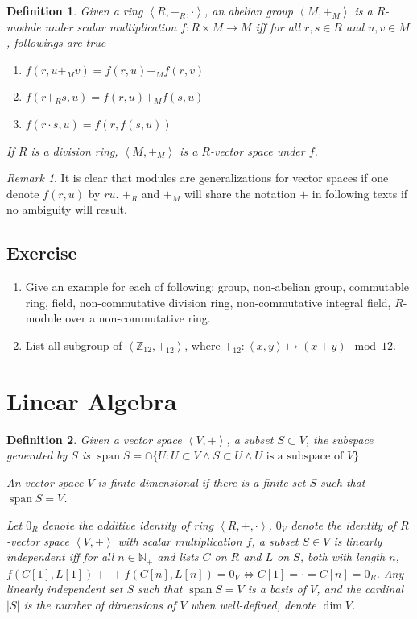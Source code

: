 \documentclass{book}
\newtheorem{definition}{Definition}
\theoremstyle{definition}\newtheorem{mechanism}{Mechanism}
\theoremstyle{remark}\newtheorem*{remark}{Remark}
\DeclareMathOperator*{\Span}{span}
\begin{document}
\begin{definition}
	Given a ring $\left<R, +_R, \cdot\right>$, an abelian group $\left<M, +_M\right>$ is a $R$-module under scalar multiplication $f: R\times M \to M$ iff for all $r, s\in R$ and $u, v \in M$, followings are true
	
	\begin{enumerate}
		\item $f(r, u +_M v) = f(r, u) +_M f(r, v)$
		\item $f(r +_R s, u) = f(r, u) +_M f(s, u)$
		\item $f(r\cdot s, u) = f(r, f(s, u))$
	\end{enumerate}
	
	If $R$ is a division ring, $\left<M, +_M\right>$ is a $R$-vector space under $f$.
\end{definition}

\begin{remark}
	It is clear that modules are generalizations for vector spaces if one denote $f(r, u)$ by $ru$. $+_R$ and $+_M$ will share the notation $+$ in following texts if no ambiguity will result.
\end{remark}

\subsection*{Exercise}

\begin{enumerate}
	\item Give an example for each of following: group, non-abelian group, commutable ring, field, non-commutative division ring, non-commutative integral field, $R$-module over a non-commutative ring.
	\item List all subgroup of $\left<\mathbb Z_12, +_{12}\right>$, where $+_{12}: \left<x, y\right>\mapsto (x + y)\mod 12$.
\end{enumerate}

\section{Linear Algebra}

\begin{definition}
	Given a vector space $\left<V, +\right>$, a subset $S\subset V$, the subspace generated by $S$ is $\Span S = \cap\{U: U\subset V\land S\subset U\land U \text{ is a subspace of $V$}\}$.
	
	An vector space $V$ is finite dimensional if there is a finite set $S$ such that $\Span S = V$.
	
	Let $0_R$ denote the additive identity of ring $\left<R, +, \cdot\right>$, $0_V$ denote the identity of $R$-vector space $\left<V, +\right>$ with scalar multiplication $f$, a subset $S\in V$ is linearly independent iff for all $n\in \mathbb N_+$ and lists $C$ on $R$ and $L$ on $S$, both with length $n$, $f(C[1], L[1]) + \cdot + f(C[n], L[n]) = 0_V \iff C[1] = \cdot = C[n] = 0_R$. Any linearly independent set $S$ such that $\Span S = V$ is a basis of $V$, and the cardinal $|S|$ is the number of dimensions of $V$ when well-defined, denote $\dim V$.
\end{definition}
\end{document}
